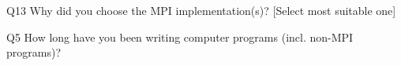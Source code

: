 \begin{description}%
\item{Q13} Why did you choose the MPI implementation(s)? [Select most suitable one]%
\item{Q5} How long have you been writing computer programs (incl. non-MPI programs)?%
\end{description}%
